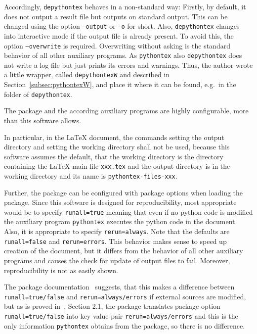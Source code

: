 Accordingly, \texttt{depythontex} behaves in a non-standard way: 
Firstly, by default, it does not output a result file but outputs on standard output. 
This can be changed using the option \texttt{--output} or \texttt{-o} for short. 
Also, \texttt{depythontex} changes into interactive mode 
if the output file is already present. 
To avoid this, the option \texttt{--overwrite} is required. 
Overwriting without asking is the standard behavior of all other auxiliary programs. 
As \texttt{pythontex} also \texttt{depythontex} does not write a log file 
but just prints its errors and warnings. 
Thus, the author wrote a little wrapper, 
called \texttt{depythontexW} and described in Section~\ref{subsec:pythontexW}, 
and place it where it can be found, e.g.~in the folder of \texttt{depythontex}. 
\medskip


The package  and the according auxiliary programs are highly configurable, 
more than this software allows. 

In particular, in the \LaTeX{} document, 
the commands  setting the output directory 
and  setting the working directory shall not be used, 
because this software assumes the default, that the working directory is the directory 
containing the \LaTeX{} main file \texttt{xxx.tex}
and the output directory is in the working directory 
and its name is \texttt{pythontex-files-xxx}. 

Further, the package  can be configured with package options when loading the package. 
Since this software is designed for reproducibility, 
most appropriate would be to specify \texttt{runall=true} meaning that even if no python code is modified 
the auxiliary program \texttt{pythontex} executes the python code in the document. 
Also, it is appropriate to specify \texttt{rerun=always}. 
Note that the defaults are \texttt{runall=false} and \texttt{rerun=errors}. 
This behavior makes sense to speed up creation of the document, 
but it differs from the behavior of all other auxiliary programs 
and causes the check for update of output files to fail. 
Moreover, reproducibility is not as easily shown. 

The package documentation~\cite{PythonTexP} suggests, 
that this makes a difference between \texttt{runall=true/false} 
and \texttt{rerun=always/errors} if external sources are modified, 
but as is proved in~\cite{PyTexInOut}, Section 2.1, 
the package translates package option \texttt{runall=true/false} into key value pair \texttt{rerun=always/errors} 
and this is the only information \texttt{pythontex} obtains from the package, 
so there is no difference. 


